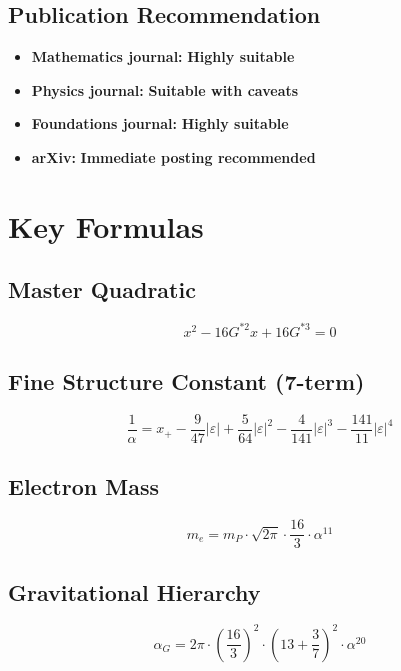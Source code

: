 \documentclass[11pt,a4paper]{article}
\begin{document}
\subsection{Publication Recommendation}

\begin{itemize}
    \item \textbf{Mathematics journal:} \textbf{Highly suitable}
    \item \textbf{Physics journal:} \textbf{Suitable with caveats}
    \item \textbf{Foundations journal:} \textbf{Highly suitable}
    \item \textbf{arXiv:} \textbf{Immediate posting recommended}
\end{itemize}

\appendix
\section{Key Formulas}

\subsection{Master Quadratic}
\begin{equation}
x^2 - 16G^{*2}x + 16G^{*3} = 0
\end{equation}

\subsection{Fine Structure Constant (7-term)}
\begin{equation}
\frac{1}{\alpha} = x_+ - \frac{9}{47}|\varepsilon| + \frac{5}{64}|\varepsilon|^2 - \frac{4}{141}|\varepsilon|^3 - \frac{141}{11}|\varepsilon|^4
\end{equation}

\subsection{Electron Mass}
\begin{equation}
m_e = m_P \cdot \sqrt{2\pi} \cdot \frac{16}{3} \cdot \alpha^{11}
\end{equation}

\subsection{Gravitational Hierarchy}
\begin{equation}
\alpha_G = 2\pi \cdot \left(\frac{16}{3}\right)^2 \cdot \left(13 + \frac{3}{7}\right)^2 \cdot \alpha^{20}
\end{equation}
\end{document}
